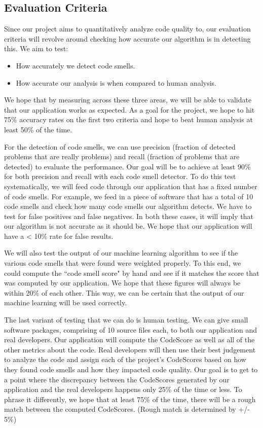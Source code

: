 \documentclass{sig-alternate}
\begin{document}
\subsection{Evaluation Criteria}
\label{subsec:eval_criteria}

Since our project aims to quantitatively analyze code quality to, our evaluation criteria will revolve around checking how accurate our algorithm is in detecting this. We aim to test:

\begin{itemize}
\item How accurately we detect code smells.
\item How accurate our analysis is when compared to human analysis.
\end{itemize}

We hope that by measuring across these three areas, we will be able to validate that our application works as expected. As a goal for the project, we hope to hit 75\% accuracy rates on the first two criteria and hope to beat human analysis at least 50\% of the time.

For the detection of code smells, we can use precision (fraction of detected problems that are really problems) and recall (fraction of problems that are detected) to evaluate the performance. Our goal will be to achieve at least 90\% for both precision and recall with each code smell detector. To do this test systematically, we will feed code through our application that has a fixed number of code smells. For example, we feed in a piece of software that has a total of 10 code smells and check how many code smells our algorithm detects. We have to test for false positives and false negatives. In both these cases, it will imply that our algorithm is not accurate as it should be. We hope that our application will have a < 10\% rate for false results. 

We will also test the output of our machine learning algorithm to see if the various code smells that were found were weighted properly. To this end, we could compute the ``code smell score" by hand and see if it matches the score that was computed by our application. We hope that these figures will always be within 20\% of each other. This way, we can be certain that the output of our machine learning will be used correctly.

The last variant of testing that we can do is human testing. We can give small software packages, comprising of 10 source files each, to both our application and real developers. Our application will compute the CodeScore as well as all of the other metrics about the code. Real developers will then use their best judgement to analyze the code and assign each of the project's CodeScores based on how they found code smells and how they impacted code quality. Our goal is to get to a point where the discrepancy between the CodeScores generated by our application and the real developers happens only 25\% of the time or less. To phrase it differently, we hope that at least 75\% of the time, there will be a rough match between the computed CodeScores. (Rough match is determined by +/- 5\%)
\end{document}
